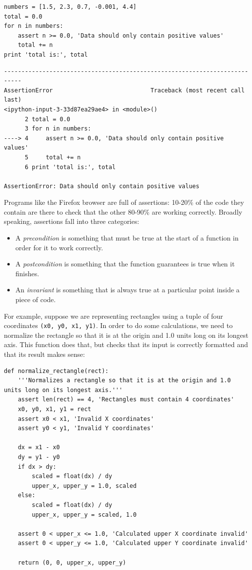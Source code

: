 \documentclass[]{book}
\newcommand{\gdef}[2]{\emph{#2}}
\begin{document}
\begin{verbatim}
numbers = [1.5, 2.3, 0.7, -0.001, 4.4]
total = 0.0
for n in numbers:
    assert n >= 0.0, 'Data should only contain positive values'
    total += n
print 'total is:', total
\end{verbatim}

\begin{verbatim}
---------------------------------------------------------------------------
AssertionError                            Traceback (most recent call last)
<ipython-input-3-33d87ea29ae4> in <module>()
      2 total = 0.0
      3 for n in numbers:
----> 4     assert n >= 0.0, 'Data should only contain positive values'
      5     total += n
      6 print 'total is:', total

AssertionError: Data should only contain positive values
\end{verbatim}

Programs like the Firefox browser are full of assertions: 10-20\% of the
code they contain are there to check that the other 80-90\% are working
correctly. Broadly speaking, assertions fall into three categories:

\begin{itemize}
\item
  A \gdef{g:precondition}{precondition} is something that must be
  true at the start of a function in order for it to work correctly.
\item
  A \gdef{g:postcondition}{postcondition} is something that the
  function guarantees is true when it finishes.
\item
  An \gdef{g:invariant}{invariant} is something that is always true
  at a particular point inside a piece of code.
\end{itemize}

For example, suppose we are representing rectangles using a tuple of
four coordinates \texttt{(x0, y0, x1, y1)}. In order to do some
calculations, we need to normalize the rectangle so that it is at the
origin and 1.0 units long on its longest axis. This function does that,
but checks that its input is correctly formatted and that its result
makes sense:

\begin{verbatim}
def normalize_rectangle(rect):
    '''Normalizes a rectangle so that it is at the origin and 1.0 units long on its longest axis.'''
    assert len(rect) == 4, 'Rectangles must contain 4 coordinates'
    x0, y0, x1, y1 = rect
    assert x0 < x1, 'Invalid X coordinates'
    assert y0 < y1, 'Invalid Y coordinates'

    dx = x1 - x0
    dy = y1 - y0
    if dx > dy:
        scaled = float(dx) / dy
        upper_x, upper_y = 1.0, scaled
    else:
        scaled = float(dx) / dy
        upper_x, upper_y = scaled, 1.0

    assert 0 < upper_x <= 1.0, 'Calculated upper X coordinate invalid'
    assert 0 < upper_y <= 1.0, 'Calculated upper Y coordinate invalid'

    return (0, 0, upper_x, upper_y)
\end{verbatim}
\end{document}

